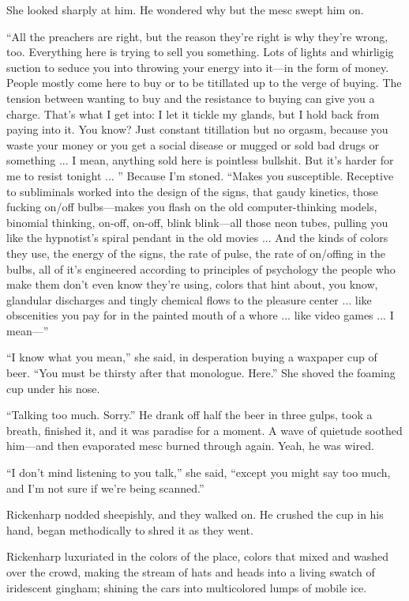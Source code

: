 She looked sharply at him. He wondered why but the mesc swept him on.

``All the preachers are right, but the reason they're right is why they're wrong, too. Everything here is trying to sell you something. Lots of lights and whirligig suction to seduce you into throwing your energy into it—in the form of money. People mostly come here to buy or to be titillated up to the verge of buying. The tension between wanting to buy and the resistance to buying can give you a charge. That's what I get into: I let it tickle my glands, but I hold back from paying into it. You know? Just constant titillation but no orgasm, because you waste your money or you get a social disease or mugged or sold bad drugs or something ... I mean, anything sold here is pointless bullshit. But it's harder for me to resist tonight ... '' Because I'm stoned. ``Makes you susceptible. Receptive to subliminals worked into the design of the signs, that gaudy kinetics, those fucking on/off bulbs—makes you flash on the old computer-thinking models, binomial thinking, on-off, on-off, blink blink—all those neon tubes, pulling you like the hypnotist's spiral pendant in the old movies ... And the kinds of colors they use, the energy of the signs, the rate of pulse, the rate of on/offing in the bulbs, all of it's engineered according to principles of psychology the people who make them don't even know they're using, colors that hint about, you know, glandular discharges and tingly chemical flows to the pleasure center ... like obscenities you pay for in the painted mouth of a whore ... like video games ... I mean—''

``I know what you mean,'' she said, in desperation buying a waxpaper cup of beer. ``You must be thirsty after that monologue. Here.'' She shoved the foaming cup under his nose.

``Talking too much. Sorry.'' He drank off half the beer in three gulps, took a breath, finished it, and it was paradise for a moment. A wave of quietude soothed him—and then evaporated mesc burned through again. Yeah, he was wired.

``I don't mind listening to you talk,'' she said, ``except you might say too much, and I'm not sure if we're being scanned.''

Rickenharp nodded sheepishly, and they walked on. He crushed the cup in his hand, began methodically to shred it as they went.

Rickenharp luxuriated in the colors of the place, colors that mixed and washed over the crowd, making the stream of hats and heads into a living swatch of iridescent gingham; shining the cars into multicolored lumps of mobile ice.


